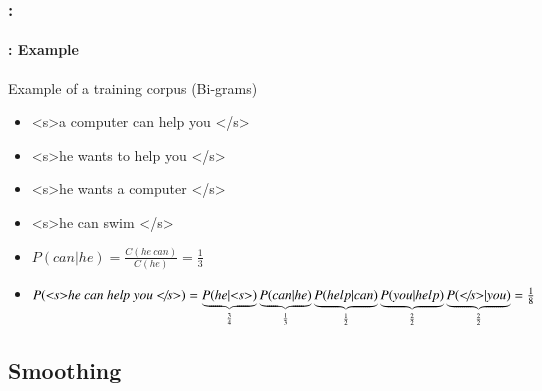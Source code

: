 \documentclass[xcolor=table]{beamer}
\begin{document}
\begin{frame}
	\frametitle{\insertshortsubtitle: \insertsection}
	\framesubtitle{\insertsubsection: Example}

	\begin{exampleblock}{Example of a training corpus (Bi-grams)}
		\begin{itemize}
			\item \textless s\textgreater a computer can help you \textless/s\textgreater
			\item \textless s\textgreater he wants to help you \textless/s\textgreater
			\item \textless s\textgreater he wants a computer \textless/s\textgreater
			\item \textless s\textgreater he can swim \textless/s\textgreater
		\end{itemize}
	\end{exampleblock}
	
	\begin{itemize}
		\item $P(can | he) = \frac{C(he\ can)}{C(he)} = \frac{1}{3}$
		\item $P(\text{\textit{\textless s\textgreater he can help you \textless/s\textgreater}}) = 
		\underbrace{P(he|\text{\textit{\textless s\textgreater}})}_{\frac{3}{4}}
		\underbrace{P(can|he)}_{\frac{1}{3}} 
		\underbrace{P(help|can)}_{\frac{1}{2}} 
		\underbrace{P(you|help)}_{\frac{2}{2}}
		\underbrace{P(\text{\textit{\textless/s\textgreater}}|you)}_{\frac{2}{2}} = 
		\frac{1}{8}
		$
	\end{itemize}

\end{frame}

\subsection{Smoothing}
\end{document}
